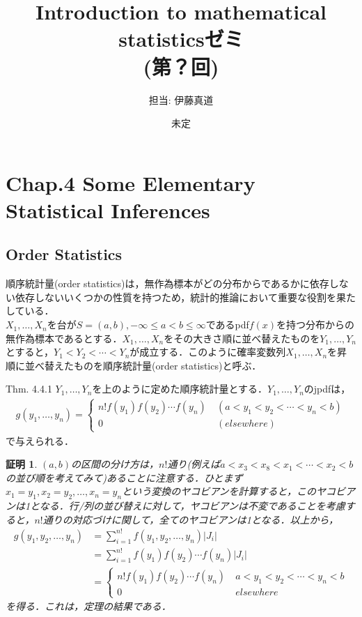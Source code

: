 \documentclass[11pt, a4paper]{jsarticle}
\title{Introduction to mathematical statisticsゼミ\\(第？回)}
\author{担当: 伊藤真道}
\date{未定}
\newtheorem{proo}{証明}[section]
\begin{document}
\maketitle


\setcounter{section}{3}
\section{Chap.4 Some Elementary Statistical Inferences}
\setcounter{subsection}{3}
\subsection{Order Statistics}
順序統計量(order statistics)は，無作為標本がどの分布からであるかに依存しない依存しないいくつかの性質を持つため，統計的推論において重要な役割を果たしている．\\
$X_1,\ldots, X_n$を台が$S=(a,b),-\infty\le a<b\le\infty$であるpdf$f(x)$を持つ分布からの無作為標本であるとする．$X_1,\ldots,X_n$をその大きさ順に並べ替えたものを$Y_1,\ldots,Y_n$とすると，$Y_1<Y_2<\cdots<Y_n$が成立する．このように確率変数列$X_1,\ldots,X_n$を昇順に並べ替えたものを順序統計量(order statistics)と呼ぶ．
\begin{itembox}[l]{Thm. 4.4.1}
$Y_1,\ldots,Y_n$を上のように定めた順序統計量とする．$Y_1,\ldots,Y_n$のjpdfは，
\begin{align*}
g(y_1,\ldots, y_n) = \left\{\begin{array}{ll}
n!f(y_1)f(y_2)\cdots f(y_n) \ &(a < y_1 < y_2 < \cdots < y_n < b)\\
0\ & (elsewhere)
\end{array}\right.\tag{4.4.1}
\end{align*}
で与えられる．
\end{itembox}
\begin{proo}
$(a,b)$の区間の分け方は，$n!$通り(例えば$a < x_3 < x_8 < x_1 < \cdots < x_2 < b$の並び順を考えてみて)あることに注意する．ひとまず$x_1 = y_1, x_2 = y_2,\ldots, x_n = y_n$という変換のヤコビアンを計算すると，このヤコビアンは1となる．行/列の並び替えに対して，ヤコビアンは不変であることを考慮すると，$n!$通りの対応づけに関して，全てのヤコビアンは1となる．以上から，
\begin{align*}
g(y_1, y_2,\ldots, y_n) &= \sum_{i = 1}^{n!}f(y_1,y_2,\ldots,y_n)|J_i|\\
&= \sum_{i = 1}^{n!}f(y_1)f(y_2)\cdots f(y_n)|J_i|\\
&= \left\{\begin{array}{ll}
n!f(y_1)f(y_2)\cdots f(y_n)\ & a< y_1 < y_2 < \cdots < y_n < b\\
0\ & elsewhere
\end{array}\right.
\end{align*}
を得る．これは，定理の結果である．
\end{proo}
\end{document}
